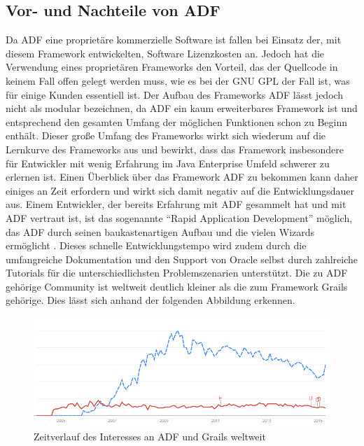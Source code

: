 \subsection{Vor- und Nachteile von ADF}
Da ADF eine proprietäre kommerzielle Software ist fallen bei Einsatz der, mit diesem Framework entwickelten, Software Lizenzkosten an. Jedoch hat die Verwendung eines proprietären Frameworks den Vorteil, das der Quellcode in keinem Fall offen gelegt werden muss, wie es bei der GNU GPL\citep{GNU2015} der Fall ist, was für einige Kunden essentiell ist. Der Aufbau des Frameworks ADF lässt jedoch nicht als modular bezeichnen, da ADF ein kaum erweiterbares Framework ist und entsprechend den gesamten Umfang der möglichen Funktionen schon zu Beginn enthält. Dieser große Umfang des Frameworks wirkt sich wiederum auf die Lernkurve des Frameworks aus und bewirkt, dass das Framework insbesondere für Entwickler mit wenig Erfahrung im Java Enterprise Umfeld schwerer zu erlernen ist\citep[S.24]{AUW2009}. Einen Überblick über das Framework ADF zu bekommen kann daher einiges an Zeit erfordern und wirkt sich damit negativ auf die Entwicklungsdauer aus. Einem Entwickler, der bereits Erfahrung mit ADF gesammelt hat und mit ADF vertraut ist, ist das sogenannte "`Rapid Application Development"' möglich, das ADF durch seinen baukastenartigen Aufbau und die vielen Wizards ermöglicht \citep[S.3]{ARIA2015}. Dieses schnelle Entwicklungstempo wird zudem durch die umfangreiche Dokumentation und den Support von Oracle selbst durch zahlreiche Tutorials für die unterschiedlichsten Problemszenarien unterstützt. Die zu ADF gehörige Community ist weltweit deutlich kleiner als die zum Framework Grails gehörige. Dies lässt sich anhand der folgenden Abbildung erkennen. 
\begin{figure}[h]
\centering
\includegraphics[width=\textwidth]{img/interesse_zeitl.png}
\caption{Zeitverlauf des Interesses an ADF und Grails weltweit \citep{GT2015} }
\end{figure}

